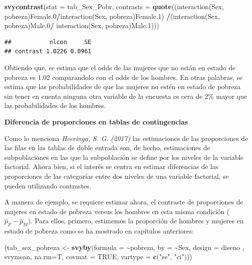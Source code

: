 \documentclass[
  spanish,
  12pt,
]{book}
\newenvironment{Shaded}{\begin{snugshade}}{\end{snugshade}}
\newcommand{\AttributeTok}[1]{\textcolor[rgb]{0.13,0.29,0.53}{#1}}
\newcommand{\ConstantTok}[1]{\textcolor[rgb]{0.56,0.35,0.01}{#1}}
\newcommand{\FunctionTok}[1]{\textcolor[rgb]{0.13,0.29,0.53}{\textbf{#1}}}
\newcommand{\NormalTok}[1]{#1}
\newcommand{\OtherTok}[1]{\textcolor[rgb]{0.56,0.35,0.01}{#1}}
\newcommand{\SpecialCharTok}[1]{\textcolor[rgb]{0.81,0.36,0.00}{\textbf{#1}}}
\newcommand{\StringTok}[1]{\textcolor[rgb]{0.31,0.60,0.02}{#1}}
\begin{document}
\begin{Shaded}
\begin{Highlighting}[]
\FunctionTok{svycontrast}\NormalTok{(}\AttributeTok{stat =}\NormalTok{ tab\_Sex\_Pobr, }
\AttributeTok{contrasts =} \FunctionTok{quote}\NormalTok{((}\StringTok{\textasciigrave{}}\AttributeTok{interaction(Sex, pobreza)Female.0}\StringTok{\textasciigrave{}}\SpecialCharTok{/}\StringTok{\textasciigrave{}}\AttributeTok{interaction(Sex, pobreza)Female.1}\StringTok{\textasciigrave{}}\NormalTok{) }\SpecialCharTok{/}\NormalTok{(}\StringTok{\textasciigrave{}}\AttributeTok{interaction(Sex, pobreza)Male.0}\StringTok{\textasciigrave{}}\SpecialCharTok{/} \StringTok{\textasciigrave{}}\AttributeTok{interaction(Sex, pobreza)Male.1}\StringTok{\textasciigrave{}}\NormalTok{)))}
\end{Highlighting}
\end{Shaded}

\begin{verbatim}
##           nlcon     SE
## contrast 1.0226 0.0961
\end{verbatim}

Obtiendo que, se estima que el odds de las mujeres que no están en estado de pobreza es 1.02 comparandolo con el odds de los hombres. En otras palabras, se estima que las probabilidades de que las mujeres no estén en estado de pobreza sin tener en cuenta ninguna otra variable de la encuesta es cera de 2\% mayor que las probabilidades de los hombres.

\textbf{Diferencia de proporciones en tablas de contingencias}

Como lo menciona \emph{Heeringa, S. G. (2017)} las estimaciones de las proporciones de las filas en las tablas de doble entrada son, de hecho, estimaciones de subpoblaciones en las que la subpoblación se define por los niveles de la variable factorial. Ahora bien, si el interés se centra en estimar diferencias de las proporciones de las categorías entre dos niveles de una variable factorial, se pueden utilizando contrastes.

A manera de ejemplo, se requiere estimar ahora, el contraste de proporciones de mujeres en estado de pobreza versus los hombres en esta misma condición (\(\hat{p}_F - \hat{p}_M\)). Para ellos, primero, estimemos la proporción de hombres y mujeres en estado de pobreza como se ha mostrado en capítulos anteriores:

\begin{Shaded}
\begin{Highlighting}[]
\NormalTok{(tab\_sex\_pobreza }\OtherTok{\textless{}{-}} \FunctionTok{svyby}\NormalTok{(}\AttributeTok{formula =} \SpecialCharTok{\textasciitilde{}}\NormalTok{pobreza, }\AttributeTok{by =} \SpecialCharTok{\textasciitilde{}}\NormalTok{Sex, }
                          \AttributeTok{design =}\NormalTok{ diseno , svymean, }\AttributeTok{na.rm=}\NormalTok{T,}
                          \AttributeTok{covmat =} \ConstantTok{TRUE}\NormalTok{, }\AttributeTok{vartype =} \FunctionTok{c}\NormalTok{(}\StringTok{"se"}\NormalTok{, }\StringTok{"ci"}\NormalTok{)))}
\end{Highlighting}
\end{Shaded}
\end{document}

